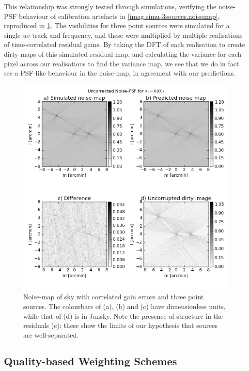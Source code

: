 \pg
This relationship was strongly tested through simulations, verifying the noise-PSF behaviour of calibration artefacts in \cref{imag.simu-3sources.noisemap}, reproduced in \cref{whatever}. The visibilities for three point sources were simulated for a single $uv$-track and frequency, and these were multiplied by multiple realisations of time-correlated residual gains. By taking the DFT of each realisation to create dirty maps of this simulated residual map, and calculating the variance for each pixel across our realisations to find the variance map, we see that we do in fact see a PSF-like behaviour in the noise-map, in agreement with our predictions.
\begin{figure}[h!]
\centering
\includegraphics[width=\textwidth]{images/Ctime6400-noisePSFandDirty-uncorr.png}
\caption{\label{whatever} {Noise-map of sky with correlated gain errors and three point sources. The colourbars of (a), (b) and (c) have dimensionless units, while that of (d) is in Jansky. Note the presence of structure in the residuals (c): these show the limits of our hypothesis that sources are well-separated.}}
\end{figure}

\subsection{Quality-based Weighting Schemes}

